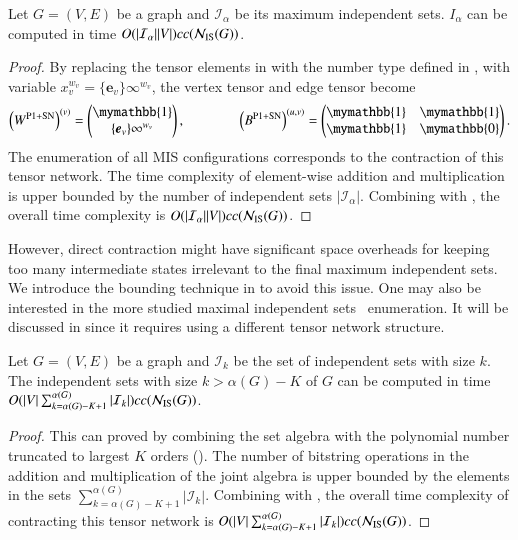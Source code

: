 \documentclass[review, onefignum, onetabnum]{siamart190516}
\begin{document}
\begin{lemma}\label{thm:complexmis}
    Let $G = (V, E)$ be a graph and $\mathcal{I}_\alpha$ be its maximum independent sets.
    $I_\alpha$ can be computed in time $O(|\mathcal{I}_\alpha||V|)cc({\mathcal{N}_{\rm IS}(G)})$.
\end{lemma}
\begin{proof}
By replacing the tensor elements in  with the number type defined in , with variable $x_v^{w_v} = \{\boldsymbol{e}_{v}\}\infty^{w_v}$, the vertex tensor and edge tensor become
\begin{equation}
    \left(W^{\rm P1+SN}\right)^{(v)} = \left(\begin{matrix}
        \mymathbb{1} \\
        \{\boldsymbol{e}_{v}\}\infty^{w_v}
    \end{matrix}\right),   
    \qquad \qquad
        \left(B^{\rm P1+SN}\right)^{(u, v)} = \left(\begin{matrix}
        \mymathbb{1}  & \mymathbb{1} \\
        \mymathbb{1} & \mymathbb{0}
    \end{matrix}\right).
\end{equation}
The enumeration of all MIS configurations corresponds to the contraction of this tensor network. The time complexity of element-wise addition and multiplication is upper bounded by the number of independent sets $|\mathcal{I}_\alpha|$. Combining with , the overall time complexity is $O(|\mathcal{I}_\alpha||V|)cc({\mathcal{N}_{\rm IS}(G)})$.
\end{proof}
However, direct contraction might have significant space overheads for keeping too many intermediate states irrelevant to the final maximum independent sets.
We introduce the bounding technique in  to avoid this issue.
One may also be interested in the more studied maximal independent sets~\cite{Bron1973, Eppstein2010, Johnson1988} enumeration.
It will be discussed in  since it requires using a different tensor network structure.

\begin{lemma}\label{thm:complexsetk}
    Let $G = (V, E)$ be a graph and $\mathcal{I}_k$ be the set of independent sets with size $k$.
    The independent sets with size $k > \alpha(G)-K$ of $G$ can be computed in time $O(|V|\sum_{k=\alpha(G)-K+1}^{\alpha(G)}|\mathcal{I}_k|)cc({\mathcal{N}_{\rm IS}(G)})$.
\end{lemma}
\begin{proof}
This can proved by combining the set algebra  with the polynomial number truncated to largest $K$ orders ().
The number of bitstring operations in the addition and multiplication of the joint algebra is upper bounded by the elements in the sets $\sum_{k=\alpha(G)-K+1}^{\alpha(G)}|\mathcal{I}_k|$.
Combining with , the overall time complexity of contracting this tensor network is $O(|V|\sum_{k=\alpha(G)-K+1}^{\alpha(G)}|\mathcal{I}_k|)cc({\mathcal{N}_{\rm IS}(G)})$.
\end{proof}
\end{document}
